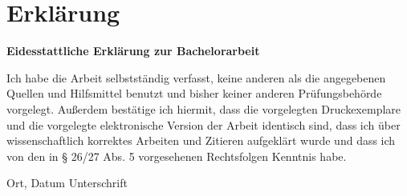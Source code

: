 \begin{thebibliography}{56}
\end{thebibliography}


\chapter*{Erklärung}

\textbf{Eidesstattliche Erklärung zur Bachelorarbeit}

Ich habe die Arbeit selbstständig verfasst, keine anderen als die angegebenen Quellen und Hilfsmittel benutzt und bisher keiner anderen Prüfungsbehörde vorgelegt. Außerdem bestätige ich hiermit, dass die vorgelegten Druckexemplare und die vorgelegte elektronische Version der Arbeit identisch sind, dass ich über wissenschaftlich korrektes Arbeiten und Zitieren aufgeklärt wurde und dass ich von den in § 26/27 Abs. 5 vorgesehenen Rechtsfolgen Kenntnis habe.

\vspace{3cm}
Ort, Datum \hspace{5cm} Unterschrift\\

